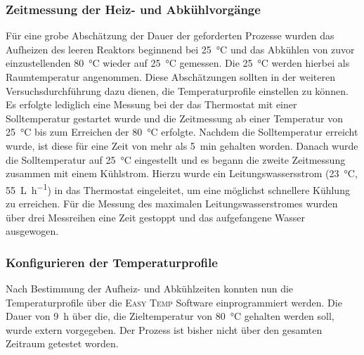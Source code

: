 \subsubsection*{Zeitmessung der Heiz- und Abkühlvorgänge}
Für eine grobe Abschätzung der Dauer der geforderten Prozesse wurden das Aufheizen des leeren Reaktors beginnend bei \SI{25}{\celsius} und das Abkühlen von zuvor einzustellenden \SI{80}{\celsius} wieder auf \SI{25}{\celsius} gemessen. Die \SI{25}{\celsius} werden hierbei als Raumtemperatur angenommen. Diese Abschätzungen sollten in der weiteren Versuchsdurchführung dazu dienen, die Temperaturprofile einstellen zu können.\\
Es erfolgte lediglich eine Messung bei der das Thermostat mit einer Solltemperatur gestartet wurde und die Zeitmessung ab einer Temperatur von \SI{25}{\celsius} bis zum Erreichen der \SI{80}{\celsius} erfolgte. Nachdem die Solltemperatur erreicht wurde, ist diese für eine Zeit von mehr als \SI{5}{\minute} gehalten worden. Danach wurde die Solltemperatur auf \SI{25}{\celsius} eingestellt und es begann die zweite Zeitmessung zusammen mit einem Kühlstrom. Hierzu wurde ein Leitungswassersstrom (\SI{23}{\celsius}, \SI{55}{\liter\per \hour}) in das Thermostat eingeleitet, um eine möglichst schnellere Kühlung zu erreichen. Für die Messung des maximalen Leitungswasserstromes wurden über drei Messreihen eine Zeit gestoppt und das aufgefangene Wasser ausgewogen.

\subsubsection*{Konfigurieren der Temperaturprofile}
Nach Bestimmung der Aufheiz- und Abkühlzeiten konnten nun die Temperaturprofile über die \textsc{Easy Temp} Software einprogrammiert werden. Die Dauer von \SI{9}{\hour} über die, die Zieltemperatur von \SI{80}{\celsius} gehalten werden soll, wurde extern vorgegeben. Der Prozess ist bisher nicht über den gesamten Zeitraum getestet worden.

%

